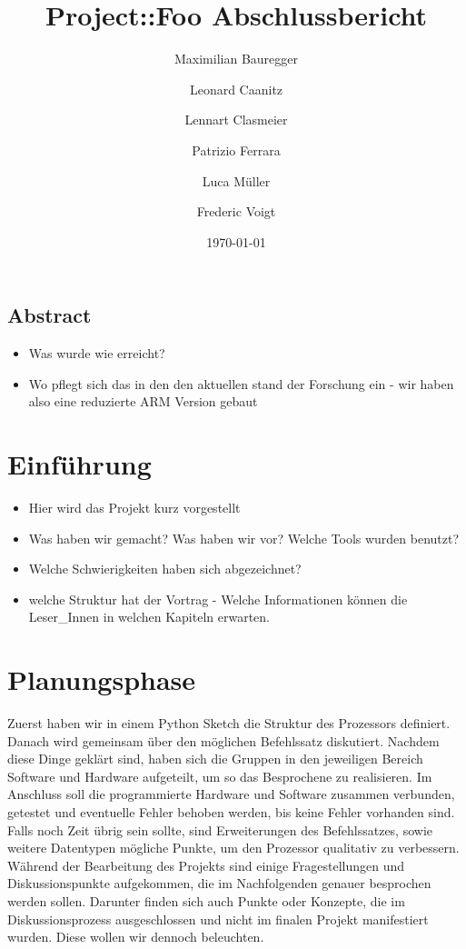 \documentclass[paper=a4,fontsize=12pt,twocolumn]{scrreprt}
\title{Project::Foo Abschlussbericht}
\author{Maximilian Bauregger \and Leonard Caanitz \and Lennart Clasmeier \and Patrizio Ferrara \and Luca Müller \and Frederic Voigt}
\date{\today}
\begin{document}
\maketitle

\tableofcontents

\section*{Abstract}

\begin{itemize}
    \item Was wurde wie erreicht?
    \item Wo pflegt sich das in den den aktuellen stand der Forschung ein - wir haben also eine reduzierte ARM Version gebaut
\end{itemize}


\chapter{Einführung}
\begin{itemize}
    \item Hier wird das Projekt kurz vorgestellt
    \item Was haben wir gemacht? Was haben wir vor? Welche Tools wurden benutzt?
    \item Welche Schwierigkeiten haben sich abgezeichnet?
    \item welche Struktur hat der Vortrag - Welche Informationen können die Leser\_Innen in welchen Kapiteln erwarten.
\end{itemize}

\chapter{Planungsphase}

Zuerst haben wir in einem Python Sketch die Struktur des Prozessors definiert.
Danach wird gemeinsam über den möglichen Befehlssatz diskutiert.
Nachdem diese Dinge geklärt sind, haben sich die Gruppen in den jeweiligen Bereich Software und Hardware aufgeteilt, um so das Besprochene zu realisieren.
Im Anschluss soll die programmierte Hardware und Software zusammen verbunden, getestet und eventuelle Fehler behoben werden, bis keine Fehler vorhanden sind.
Falls noch Zeit übrig sein sollte, sind Erweiterungen des Befehlssatzes, sowie weitere Datentypen mögliche Punkte, um den Prozessor qualitativ zu verbessern.
Während der Bearbeitung des Projekts sind einige Fragestellungen und Diskussionspunkte aufgekommen, die im Nachfolgenden genauer besprochen werden sollen. Darunter finden sich auch Punkte oder Konzepte, die im Diskussionsprozess ausgeschlossen und nicht im finalen Projekt manifestiert wurden. Diese wollen wir dennoch beleuchten.
\end{document}
